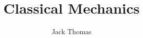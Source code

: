 \documentclass[]{report}
\begin{document}
\title{Classical Mechanics}
\author{Jack Thomas}
\date{}

\maketitle
\newpage

\tableofcontents
\newpage






\end{document}
